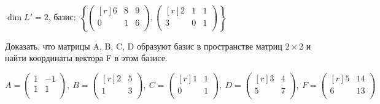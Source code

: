 $\dim  L'=2$, базис: 
$\left\{
\begin{pmatrix*}[r]
	 6 & 8 & 9 \\
	 0 & 1 & 6 \\
	\end{pmatrix*} 
,
	\begin{pmatrix*}[r]
	 2 & 1 & 1 \\
	 3 & 0 & 1 \\
	\end{pmatrix*} 
\right\}$\\
\begin{prim}
Доказать, что матрицы A, B, C, D образуют базис в пространстве матриц $2 \times 2$ и найти координаты вектора F в этом базисе.
\end{prim}
$$
A=
\begin{pmatrix*}
	 1 & -1 \\
	 1 & 1  \\
	\end{pmatrix*} 
,\  %
B=
\begin{pmatrix*}[r]
	 2 & 5 \\
	 1 & 3  \\
	\end{pmatrix*}
,\  
C=
\begin{pmatrix*}[r]
	 1 & 1 \\
	 0 & 1  \\
	\end{pmatrix*} 
, \ 
D=
\begin{pmatrix*}[r]
	 3 & 4 \\
	 5 & 7  \\
	\end{pmatrix*} 
,\  
F=
\begin{pmatrix*}[r]
	 5 & 14 \\
	 6 & 13  \\
	\end{pmatrix*} 
$$
